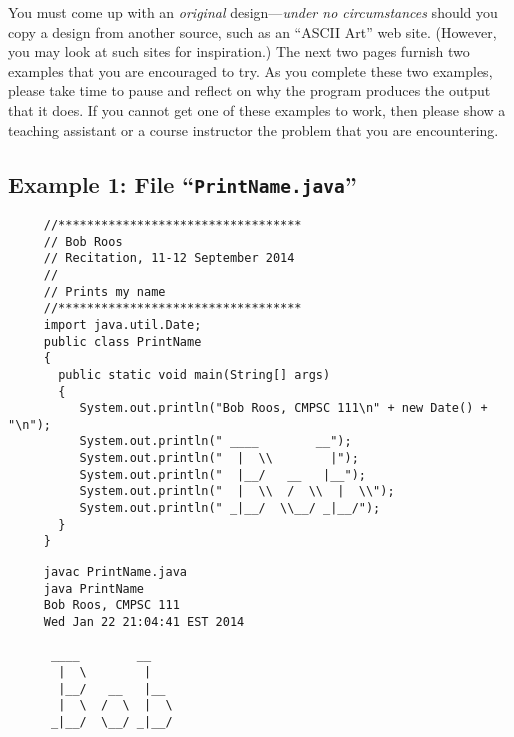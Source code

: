 You must come up with an {\em original} design---{\em under no circumstances} should you copy a design from another
source, such as an ``ASCII Art'' web site. (However, you may look at such sites for inspiration.) The next two pages
furnish two examples that you are encouraged to try. As you complete these two examples, please take time to pause and
reflect on why the program produces the output that it does.  If you cannot get one of these examples to work, then
please show a teaching assistant or a course instructor the problem that you are encountering.

\newpage

\subsection*{Example 1: File ``{\tt PrintName.java}''}
\begin{verbatim}
     //**********************************
     // Bob Roos
     // Recitation, 11-12 September 2014
     //
     // Prints my name
     //**********************************
     import java.util.Date;
     public class PrintName
     {
       public static void main(String[] args)
       {
          System.out.println("Bob Roos, CMPSC 111\n" + new Date() + "\n");
          System.out.println(" ____        __");
          System.out.println("  |  \\        |");
          System.out.println("  |__/   __   |__");
          System.out.println("  |  \\  /  \\  |  \\");
          System.out.println(" _|__/  \\__/ _|__/");
       }
     }
\end{verbatim}

\begin{verbatim}
     javac PrintName.java
     java PrintName
     Bob Roos, CMPSC 111
     Wed Jan 22 21:04:41 EST 2014
     
      ____        __
       |  \        |
       |__/   __   |__
       |  \  /  \  |  \
      _|__/  \__/ _|__/
\end{verbatim}

\newpage

